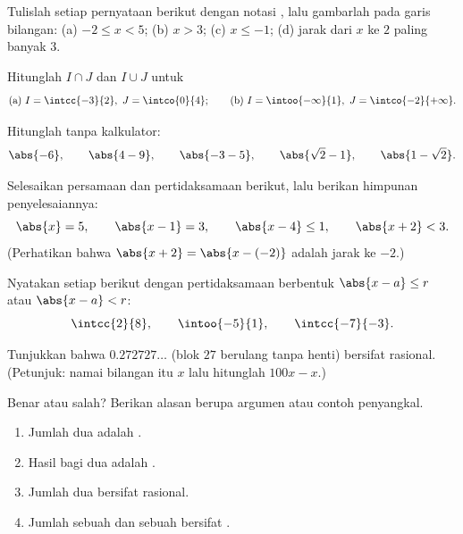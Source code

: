 \begin{exercise}[$\star$]\label{exo:g10:numbers:2}
Tulislah setiap pernyataan berikut dengan notasi , lalu gambarlah pada
garis bilangan: (a) $-2 \leq x < 5$; (b) $x > 3$; (c) $x \leq -1$;
(d) jarak dari $x$ ke $2$ paling banyak $3$.
\end{exercise}

\begin{exercise}[$\star$]\label{exo:g10:numbers:3}
Hitunglah $I \cap J$ dan $I \cup J$ untuk
\[
\text{(a) } I = \intcc{-3}{2},\ J = \intco{0}{4};
\qquad
\text{(b) } I = \intoo{-\infty}{1},\ J = \intco{-2}{+\infty}.
\]
\end{exercise}

\begin{exercise}[$\star$]\label{exo:g10:numbers:4}
Hitunglah tanpa kalkulator:
\[
\abs{-6}, \qquad \abs{4 - 9}, \qquad \abs{-3 - 5}, \qquad
\abs{\sqrt 2 - 1}, \qquad \abs{1 - \sqrt 2}.
\]
\end{exercise}

\begin{exercise}[$\star$]\label{exo:g10:numbers:5}
Selesaikan persamaan dan pertidaksamaan berikut, lalu berikan himpunan penyelesaiannya:
\[
\abs{x} = 5, \qquad \abs{x - 1} = 3, \qquad \abs{x - 4} \leq 1, \qquad
\abs{x + 2} < 3 .
\]
(Perhatikan bahwa $\abs{x+2} = \abs{x - (-2)}$ adalah jarak ke $-2$.)
\end{exercise}

\begin{exercise}[$\star\star$]\label{exo:g10:numbers:6}
Nyatakan setiap  berikut dengan pertidaksamaan berbentuk
$\abs{x - a} \leq r$ atau $\abs{x - a} < r$:
\[
\intcc{2}{8}, \qquad \intoo{-5}{1}, \qquad \intcc{-7}{-3}.
\]
\end{exercise}

\begin{exercise}[$\star\star$]\label{exo:g10:numbers:7}
Tunjukkan bahwa $0.272727\dots$ (blok $27$ berulang tanpa henti) bersifat rasional.
(Petunjuk: namai bilangan itu $x$ lalu hitunglah $100x - x$.)
\end{exercise}

\begin{exercise}[$\star\star$]\label{exo:g10:numbers:8}
Benar atau salah? Berikan alasan berupa argumen atau contoh penyangkal.
\begin{enumerate}
  \item Jumlah dua  adalah .
  \item Hasil bagi dua  adalah .
  \item Jumlah dua  bersifat rasional.
  \item Jumlah sebuah  dan sebuah 
        bersifat .
\end{enumerate}
\end{exercise}

